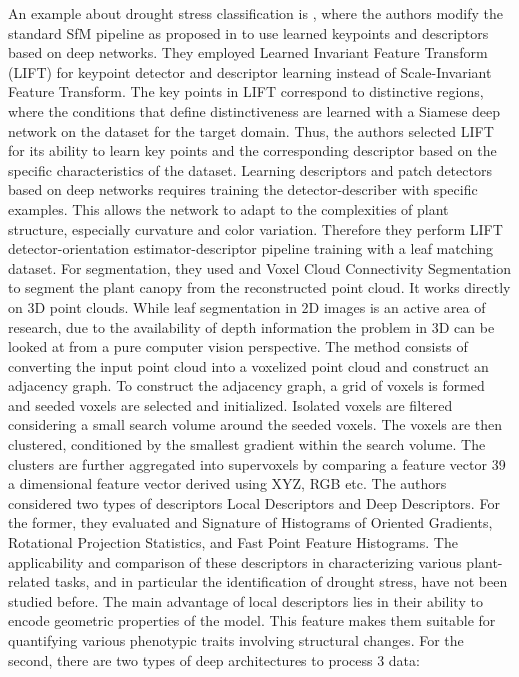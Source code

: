 An example about drought stress classification is \cite{srivastava2017drought}, where the authors modify the standard SfM pipeline as proposed in to use learned keypoints and descriptors based on deep networks. They employed Learned Invariant Feature
Transform (LIFT) for keypoint detector and descriptor learning instead of Scale-Invariant Feature Transform. The key points in LIFT correspond to distinctive regions,
where the conditions that define distinctiveness are learned with a Siamese deep network on the dataset for the target domain. Thus, the authors selected LIFT for its
ability to learn key points and the corresponding descriptor based on the specific characteristics of the dataset. Learning descriptors and patch detectors based on deep
networks requires training the detector-describer with specific examples. This allows the network to adapt to the complexities of plant structure, especially curvature
and color variation. Therefore they perform LIFT detector-orientation estimator-descriptor pipeline training with a leaf matching dataset. For segmentation, they used
and Voxel Cloud Connectivity Segmentation to segment the plant canopy from the reconstructed point cloud. It works directly on 3D point clouds. While leaf segmentation
in 2D images is an active area of research, due to the availability of depth information the problem in 3D can be looked at from a pure computer vision perspective. The
method consists of converting the input point cloud into a voxelized point cloud and construct an adjacency graph. To construct the adjacency graph, a grid of voxels is
formed and seeded voxels are selected and initialized. Isolated voxels are filtered considering a small search volume around the seeded voxels. The voxels are then
clustered, conditioned by the smallest gradient within the search volume. The clusters are further aggregated into supervoxels by comparing a feature vector 39 a
dimensional feature vector derived using XYZ, RGB etc. The authors considered two types of descriptors Local Descriptors and Deep Descriptors. For the former,
they evaluated and Signature of Histograms of Oriented Gradients, Rotational Projection Statistics, and Fast Point Feature Histograms. The applicability and comparison
of these descriptors in characterizing various plant-related tasks, and in particular the identification of drought stress, have not been studied before.
The main advantage of local descriptors lies in their ability to encode geometric properties of the model. This feature makes them suitable for quantifying various
phenotypic traits involving structural changes. For the second, there are two types of deep architectures to process 3 data:

